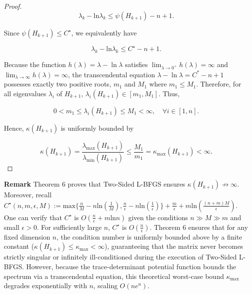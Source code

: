 \documentclass[twoside,11pt]{article}
\begin{document}
\begin{proof}
\begin{equation}
\lambda_k - \text{ln}\lambda_k \leq \psi(H_{k+1}) - n + 1.
\end{equation}

\noindent
Since $\psi(H_{k+1}) \leq C^\star$, we equivalently have

\begin{equation}
\lambda_k - \text{ln}\lambda_k \leq C^\star - n + 1.
\end{equation}

\noindent
Because the function $h(\lambda) = \lambda - \ln\lambda$ satisfies $\lim_{\lambda \to 0^+} h(\lambda) = \infty$ and $\lim_{\lambda \to \infty} h(\lambda) = \infty$, the transcendental equation $\lambda - \ln\lambda = C^* - n + 1$ possesses exactly two positive roots, $m_1$ and $M_1$ where $m_1 \leq M_1$. Therefore, for all eigenvalues $\lambda_i$ of $H_{k+1}$, $\lambda_i(H_{k+1}) \in [m_1, M_1]$. Thus,

\begin{equation}
0 < m_1 \leq \lambda_i(H_{k+1}) \leq M_1 < \infty, \quad \forall i \in [1,n].
\end{equation}

\noindent
Hence, $\kappa(H_{k+1})$ is uniformly bounded by

\begin{equation}
\kappa(H_{k+1}) = \frac{\lambda_{\text{max}}(H_{k+1})}{\lambda_{\text{min}}(H_{k+1})} \leq \frac{M_1}{m_1} = \kappa_{\text{max}}(H_{k+1}) < \infty.
\end{equation}
\end{proof}

\noindent
\textbf{Remark} Theorem 6 proves that Two-Sided L-BFGS ensures $\kappa(H_{k+1}) \not\to \infty$. Moreover, recall $C^{\star}(n,m, \epsilon, M) := \text{max}\{\frac{n}{M}-n\text{ln}(\frac{1}{M}), \frac{n}{\epsilon}-n\text{ln}(\frac{1}{\epsilon})\} + \frac{m}{\epsilon} + m\text{ln}(\frac{(n+m)M}{\epsilon})$. One can verify that $C^\star$ is $O(\frac{n}{\epsilon} + m\text{ln}n)$ given the conditions $n \gg M \gg m$ and small $\epsilon > 0$. For sufficiently large $n$, $C^\star$ is $O(\frac{n} {\epsilon})$. Theorem 6 ensures that for any fixed dimension $n$, the condition number is uniformly bounded above by a finite constant ($\kappa(H_{k+1}) \leq \kappa_{\text{max}} < \infty$), guaranteeing that the matrix never becomes strictly singular or infinitely ill-conditioned during the execution of Two-Sided L-BFGS. However, because the trace-determinant potential function bounds the spectrum via a transcendental equation, this theoretical worst-case bound $\kappa_{\text{max}}$ degrades exponentially with $n$, scaling $O(n e^n)$.
\end{document}
